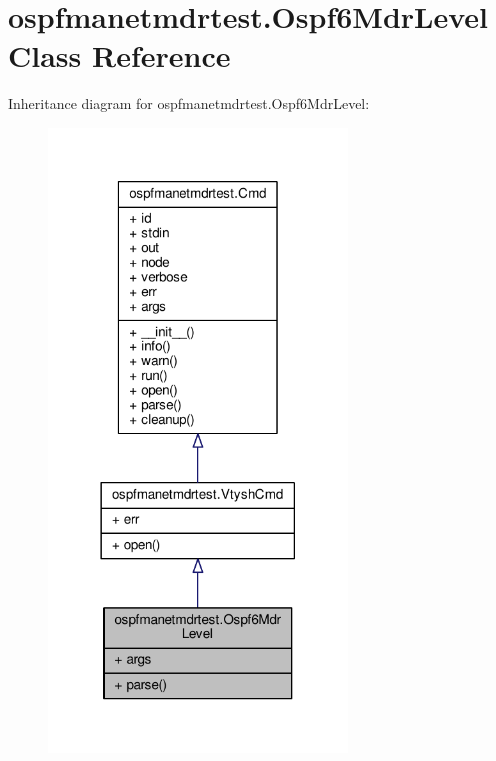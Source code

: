 \hypertarget{classospfmanetmdrtest_1_1_ospf6_mdr_level}{\section{ospfmanetmdrtest.\+Ospf6\+Mdr\+Level Class Reference}
\label{classospfmanetmdrtest_1_1_ospf6_mdr_level}
}


Inheritance diagram for ospfmanetmdrtest.\+Ospf6\+Mdr\+Level\+:
\nopagebreak
\begin{figure}[H]
\begin{center}
\leavevmode
\includegraphics[width=225pt]{classospfmanetmdrtest_1_1_ospf6_mdr_level__inherit__graph}
\end{center}
\end{figure}


